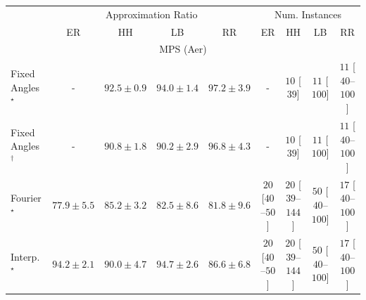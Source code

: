 \begin{tabular}{l|cccc|cccc|}
\toprule
& \multicolumn{4}{c|}{Approximation Ratio} & \multicolumn{4}{c|}{Num. Instances} \\
            & ER & HH & LB & RR & ER & HH & LB & RR \\
\midrule
\multicolumn{9}{c}{\rule{0pt}{8pt}MPS (Aer)} \\
\midrule
Fixed Angles$^\star$ & {\cellcolor[HTML]{000000}} \color[HTML]{F1F1F1} {\cellcolor{white}} \color{black} - & {\cellcolor[HTML]{7E0E79}} \color[HTML]{F1F1F1} $92.5\pm 0.9$ & {\cellcolor[HTML]{710A6D}} \color[HTML]{F1F1F1} $94.0\pm 1.4$ & {\cellcolor[HTML]{540251}} \color[HTML]{F1F1F1} $97.2\pm 3.9$ & {\cellcolor[HTML]{000000}} \color[HTML]{F1F1F1} {\cellcolor{white}} \color{black} - & {\cellcolor[HTML]{FFF7F3}} \color[HTML]{000000} $10$ [$39$] & {\cellcolor[HTML]{FFF6F2}} \color[HTML]{000000} $11$ [$100$] & {\cellcolor[HTML]{FFF6F2}} \color[HTML]{000000} $11$ [$40$--$100$] \\
Fixed Angles$^\dagger$ & {\cellcolor[HTML]{000000}} \color[HTML]{F1F1F1} {\cellcolor{white}} \color{black} - & {\cellcolor[HTML]{831A83}} \color[HTML]{F1F1F1} $90.8\pm 1.8$ & {\cellcolor[HTML]{832088}} \color[HTML]{F1F1F1} $90.2\pm 2.9$ & {\cellcolor[HTML]{570354}} \color[HTML]{F1F1F1} $96.8\pm 4.3$ & {\cellcolor[HTML]{000000}} \color[HTML]{F1F1F1} {\cellcolor{white}} \color{black} - & {\cellcolor[HTML]{FFF7F3}} \color[HTML]{000000} $10$ [$39$] & {\cellcolor[HTML]{FFF6F2}} \color[HTML]{000000} $11$ [$100$] & {\cellcolor[HTML]{FFF6F2}} \color[HTML]{000000} $11$ [$40$--$100$] \\
Fourier$^\star$ & {\cellcolor[HTML]{8C80BB}} \color[HTML]{F1F1F1} $77.9\pm 5.5$ & {\cellcolor[HTML]{894BA2}} \color[HTML]{F1F1F1} $85.2\pm 3.2$ & {\cellcolor[HTML]{8B5EAB}} \color[HTML]{F1F1F1} $82.5\pm 8.6$ & {\cellcolor[HTML]{8B62AD}} \color[HTML]{F1F1F1} $81.8\pm 9.6$ & {\cellcolor[HTML]{FFF4F0}} \color[HTML]{000000} $20$ [$40$--$50$] & {\cellcolor[HTML]{FFF4F0}} \color[HTML]{000000} $20$ [$39$--$144$] & {\cellcolor[HTML]{FEEDE9}} \color[HTML]{000000} $50$ [$40$--$100$] & {\cellcolor[HTML]{FFF5F1}} \color[HTML]{000000} $17$ [$40$--$100$] \\
Interp.$^\star$ & {\cellcolor[HTML]{6F0A6B}} \color[HTML]{F1F1F1} $94.2\pm 2.1$ & {\cellcolor[HTML]{842289}} \color[HTML]{F1F1F1} $90.0\pm 4.7$ & {\cellcolor[HTML]{6A0867}} \color[HTML]{F1F1F1} $94.7\pm 2.6$ & {\cellcolor[HTML]{88409C}} \color[HTML]{F1F1F1} $86.6\pm 6.8$ & {\cellcolor[HTML]{FFF4F0}} \color[HTML]{000000} $20$ [$40$--$50$] & {\cellcolor[HTML]{FFF4F0}} \color[HTML]{000000} $20$ [$39$--$144$] & {\cellcolor[HTML]{FEEDE9}} \color[HTML]{000000} $50$ [$40$--$100$] & {\cellcolor[HTML]{FFF5F1}} \color[HTML]{000000} $17$ [$40$--$100$] \\

\end{tabular}
